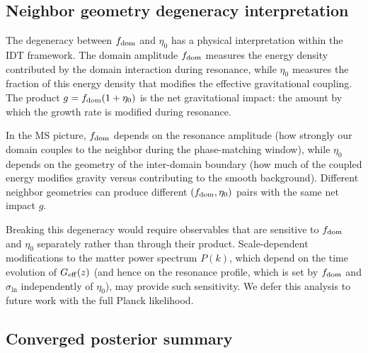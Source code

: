 \documentclass[aps,prd,twocolumn,superscriptaddress,nofootinbib]{revtex4-2}
\newcommand{\fdom}{f_{\rm dom}}
\newcommand{\sln}{\sigma_{\ln}}
\newcommand{\Geff}{G_{\rm eff}}
\newcommand{\etaz}{\eta_0}
\begin{document}
\subsection{Neighbor geometry degeneracy interpretation}
\label{sec:degeneracy}

The degeneracy between $\fdom$ and $\etaz$ has a physical
interpretation within the IDT framework. The domain amplitude $\fdom$
measures the energy density contributed by the domain interaction
during resonance, while $\etaz$ measures the fraction of this energy
density that modifies the effective gravitational coupling. The
product $g = \fdom(1 + \etaz)$ is the net gravitational impact: the
amount by which the growth rate is modified during resonance.

In the MS picture, $\fdom$ depends on the resonance amplitude (how
strongly our domain couples to the neighbor during the phase-matching
window), while $\etaz$ depends on the geometry of the inter-domain
boundary (how much of the coupled energy modifies gravity versus
contributing to the smooth background). Different neighbor
geometries can produce different $(\fdom, \etaz)$ pairs with the same
net impact $g$.

Breaking this degeneracy would require observables that are
sensitive to $\fdom$ and $\etaz$ separately rather than through their
product. Scale-dependent modifications to the matter power spectrum
$P(k)$, which depend on the time evolution of $\Geff(z)$ (and hence
on the resonance profile, which is set by $\fdom$ and $\sln$
independently of $\etaz$), may provide such sensitivity. We defer
this analysis to future work with the full Planck likelihood.

\subsection{Converged posterior summary}
\label{sec:posterior_summary}
\end{document}
